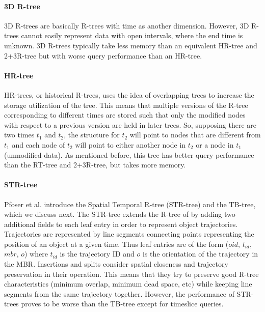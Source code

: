 \paragraph{3D R-tree} 3D R-trees \cite{nascimento1999evaluation} are basically
R-trees with time as another dimension. However, 3D R-trees cannot 
easily represent data with open intervals, where the end time is unknown. 
3D R-trees typically take less
memory than an equivalent HR-tree and 2+3R-tree but with worse query 
performance than an HR-tree.

\paragraph{HR-tree} HR-trees, or historical R-trees, 
\cite{nascimento1999evaluation} uses the idea of overlapping trees to 
increase the storage utilization of the tree. This means that multiple 
versions of the R-tree corresponding to different times are stored such 
that only the modified nodes with respect to a previous version are 
held in later trees. So, supposing there are two times $t_1$ and $t_2$, the
structure for $t_2$ will point to nodes that are different from $t_1$ and
each node of $t_2$ will point to either another node in $t_2$ or a node in
$t_1$ (unmodified data). As mentioned before, this tree has better query
performance than the RT-tree and 2+3R-tree, but takes more memory.

\paragraph{STR-tree} Pfoser et al. introduce the Spatial Temporal R-tree 
(STR-tree) and the TB-tree, which we discuss next\cite{pfoser2000novel}. 
The STR-tree extends the R-tree of \cite{guttman84} by adding two additional
fields to each leaf entry in order to represent object trajectories. 
Trajectories are represented by line segments connecting points representing
the position of an object at a given time. Thus leaf entries are of the 
form ($oid$, $t_{id}$, $mbr$, $o$) where $t_{id}$ is the trajectory ID and 
$o$ is the orientation of the trajectory in the MBR. Insertions and splits 
consider spatial closeness and trajectory preservation in their operation.
This means that they try to preserve good R-tree characteristics (minimum 
overlap, minimum dead space, etc) while keeping line segments from the 
same trajectory together. However, the performance of STR-trees proves to
be worse than the TB-tree except for timeslice queries.

